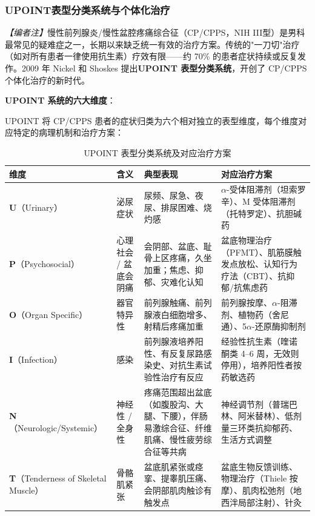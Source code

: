 \subsubsection{UPOINT表型分类系统与个体化治疗}
\label{subsec:upoint}

\noindent\textit{【编者注】}慢性前列腺炎/慢性盆腔疼痛综合征（CP/CPPS，NIH III型）是男科最常见的疑难症之一，长期以来缺乏统一有效的治疗方案。传统的"一刀切"治疗（如对所有患者一律使用抗生素）疗效有限——约 70\% 的患者症状持续或反复发作。2009 年 Nickel 和 Shoskes 提出\textbf{UPOINT 表型分类系统}，开创了 CP/CPPS 个体化治疗的新时代。

\vspace{0.5em}
\noindent\textbf{UPOINT 系统的六大维度}：

UPOINT 将 CP/CPPS 患者的症状归类为六个相对独立的表型维度，每个维度对应特定的病理机制和治疗方案：

\begin{table}[htbp]
\centering
\caption{UPOINT 表型分类系统及对应治疗方案}
\label{tab:upoint}
\begin{tabularx}{\textwidth}{@{}llXX@{}}
    \toprule
    \textbf{维度} & \textbf{含义} & \textbf{典型表现} & \textbf{对应治疗方案} \\
    \midrule
    \textbf{U}（Urinary） & 泌尿症状 & 尿频、尿急、夜尿、排尿困难、烧灼感 & $\alpha$-受体阻滞剂（坦索罗辛）、M 受体阻滞剂（托特罗定）、抗胆碱药 \\
    \textbf{P}（Psychosocial） & 心理社会 / 盆底会阴痛 & 会阴部、盆底、耻骨上区疼痛，久坐加重；焦虑、抑郁、灾难化认知 & 盆底物理治疗（PFMT）、肌筋膜触发点放松、认知行为疗法（CBT）、抗抑郁/抗焦虑药 \\
    \textbf{O}（Organ Specific） & 器官特异性 & 前列腺触痛、前列腺液白细胞增多、射精后疼痛加重 & 前列腺按摩、$\alpha$-阻滞剂、植物药（舍尼通）、5$\alpha$-还原酶抑制剂 \\
    \textbf{I}（Infection） & 感染 & 前列腺液培养阳性、有反复尿路感染史、对抗生素试验性治疗有反应 & 经验性抗生素（喹诺酮类 4--6 周，无效则停用），培养阳性者按药敏选药 \\
    \textbf{N}（Neurologic/Systemic） & 神经性 / 全身性 & 疼痛范围超出盆底（如腹股沟、大腿、下腰），伴肠易激综合征、纤维肌痛、慢性疲劳综合征等共病 & 神经调节剂（普瑞巴林、阿米替林）、低剂量三环类抗抑郁药、生活方式调整 \\
    \textbf{T}（Tenderness of Skeletal Muscle） & 骨骼肌紧张 & 盆底肌紧张或痉挛、提睾肌压痛、会阴部肌肉触诊有触发点 & 盆底生物反馈训练、物理治疗（Thiele 按摩）、肌肉松弛剂（地西泮局部注射）、针灸 \\
    \bottomrule
\end{tabularx}
\end{table}

